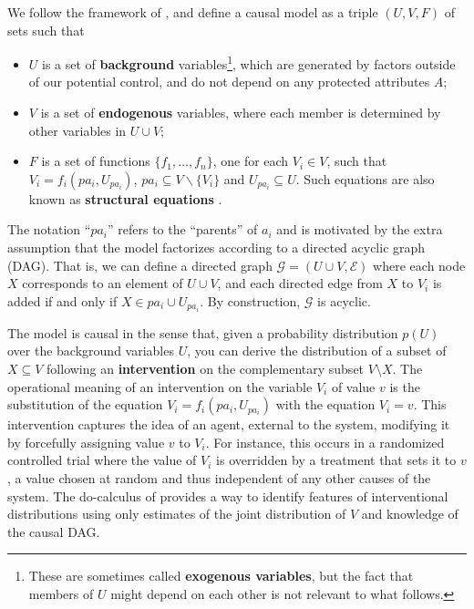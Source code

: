 


\label{subsec:cmc}
We  follow the framework of \citet{pearl:00}, and define a causal
model as a triple $(U, V, F)$ of sets such that
\begin{itemize}
\item $U$ is a set of {\bf background} variables\footnote{These are
  sometimes called {\bf exogenous variables}, but the fact that members of $U$
  might depend on each other is not relevant to what follows.}, which are generated by factors
outside of our potential control, and do not depend on any protected attributes $A$;
\item $V$ is a set of {\bf endogenous} variables, where each member is determined by
  other variables in $U \cup V$;
\item $F$ is a set of functions $\{f_1, \dots, f_n\}$, one for each $V_i \in V$, such
that $V_i = f_i(pa_i, U_{pa_i})$, $pa_i \subseteq V \backslash
\{V_i\}$ and $U_{pa_i} \subseteq U$. Such equations are also known as
{\bf structural equations} \citep{bol:89}.
\end{itemize}

The notation ``$pa_i$'' refers to the ``parents'' of $a_i$ and is motivated by the extra assumption that the
model factorizes according to a directed acyclic graph (DAG). That is, we can
define a directed graph ${\mathcal G}=(U \cup V, \mathcal E )$ where each node $X$ corresponds to an
element of $U \cup V$, and each directed edge from $X$ to $V_i$ is added if
and only if $X \in pa_i \cup U_{pa_i}$. By construction, $\mathcal G$ is
acyclic.

The model is causal in the sense that, given a  probability distribution
$p(U)$ over the background variables $U$, you can derive the distribution of a
subset of $X\subseteq V$ following an {\bf intervention} on the complementary
subset  $V\setminus X$.  The operational meaning of an intervention on the variable $V_i$ of
value $v$ is the substitution of the equation
$V_i = f_i(pa_i, U_{pa_i})$ with the equation $V_i = v$. This intervention captures
the idea of an agent, external to the system, modifying it by forcefully assigning value $v$ to $V_i$. For
instance, this occurs in a randomized controlled trial where the value of $V_i$ is overridden by a treatment that sets it to $v$, a
value chosen at random and thus independent of any other causes of the
system. The do-calculus of \citet{pearl:00} provides a way to identify
features of interventional distributions %
using only estimates of the joint distribution of $V$ and knowledge of
the causal DAG.

